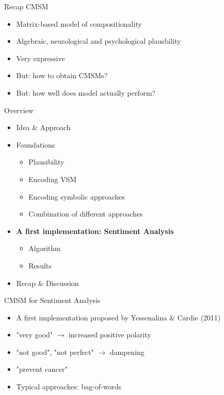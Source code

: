 \documentclass[12pt,a4paper]{beamer}
\begin{document}
\begin{frame}{Recap CMSM}
\begin{itemize}
\item Matrix-based model of compositionality
\item Algebraic, neurological and psychological plausbility
\item Very expressive
\item But: how to obtain CMSMs?
\item But: how well does model actually perform?
\end{itemize}

\end{frame}


\begin{frame}{Overview}
\begin{itemize}
\item Idea \& Approach %
\item Foundations
\begin{itemize}
    \item Plausibility %
    \item Encoding VSM %
    \item Encoding symbolic approaches
    \item Combination of different approaches
\end{itemize}
\item \textbf{A first implementation: Sentiment Analysis}
\begin{itemize}
    \item Algorithm %
    \item Results %
\end{itemize}
\item Recap \& Discussion
\end{itemize}
\end{frame}



\begin{frame}{CMSM for Sentiment Analysis}
\begin{itemize}
\item A first implementation proposed by Yessenalina \&  Cardie (2011)
\item "very good" $\to$ increased positive polarity
\item "not good", "not perfect" $\to$ dampening
\item "prevent cancer"
\item Typical approaches: bag-of-words
\end{itemize}
\end{frame}
\end{document}
